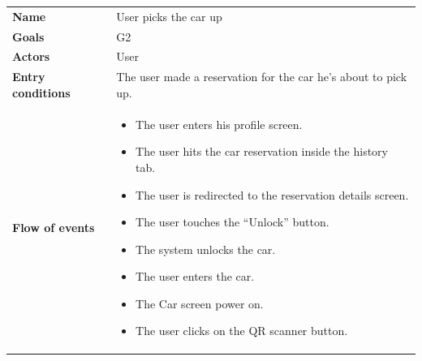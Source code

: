 \documentclass[]{article}
\providecommand{\tightlist}{%
  \setlength{\itemsep}{0pt}\setlength{\parskip}{0pt}}
\begin{document}
\begin{longtable}[]{@{}ll@{}}
\toprule
\begin{minipage}[t]{0.29\columnwidth}\raggedright\strut
\textbf{Name}\strut
\end{minipage} & \begin{minipage}[t]{0.65\columnwidth}\raggedright\strut
User picks the car up\strut
\end{minipage}\tabularnewline
\begin{minipage}[t]{0.29\columnwidth}\raggedright\strut
\textbf{Goals}\strut
\end{minipage} & \begin{minipage}[t]{0.65\columnwidth}\raggedright\strut
G2\strut
\end{minipage}\tabularnewline
\begin{minipage}[t]{0.29\columnwidth}\raggedright\strut
\textbf{Actors}\strut
\end{minipage} & \begin{minipage}[t]{0.65\columnwidth}\raggedright\strut
User\strut
\end{minipage}\tabularnewline
\begin{minipage}[t]{0.29\columnwidth}\raggedright\strut
\textbf{Entry conditions}\strut
\end{minipage} & \begin{minipage}[t]{0.65\columnwidth}\raggedright\strut
The user made a reservation for the car he's about to pick up.\strut
\end{minipage}\tabularnewline
\begin{minipage}[t]{0.29\columnwidth}\raggedright\strut
\textbf{Flow of events}\strut
\end{minipage} & \begin{minipage}[t]{0.65\columnwidth}\raggedright\strut
\begin{itemize}
\tightlist
\item
  The user enters his profile screen.
\item
  The user hits the car reservation inside the history tab.
\item
  The user is redirected to the reservation details screen.
\item
  The user touches the ``Unlock'' button.
\item
  The system unlocks the car.
\item
  The user enters the car.
\item
  The Car screen power on.
\item
  The user clicks on the QR scanner button.

\end{itemize}
\end{minipage}
\end{longtable}
\end{document}
